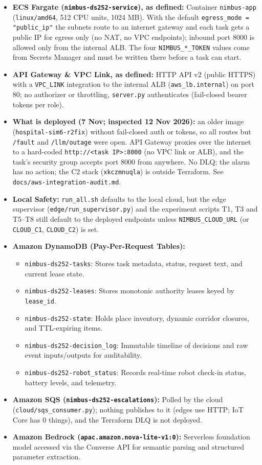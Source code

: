 \documentclass[10pt,letterpaper]{article}
\begin{document}
\begin{itemize}
  \item \textbf{ECS Fargate (\texttt{nimbus-ds252-service}), as defined:} Container \texttt{nimbus-app} (\texttt{linux/amd64}, 512 CPU units, 1024 MB). With the default \texttt{egress\_mode = "public\_ip"} the subnets route to an internet gateway and each task gets a public IP for egress only (no NAT, no VPC endpoints); inbound port 8000 is allowed only from the internal ALB. The four \texttt{NIMBUS\_*\_TOKEN} values come from Secrets Manager and must be written there before a task can start.
  \item \textbf{API Gateway \& VPC Link, as defined:} HTTP API v2 (public HTTPS) with a \texttt{VPC\_LINK} integration to the internal ALB (\texttt{aws\_lb.internal}) on port 80; no authorizer or throttling, \texttt{server.py} authenticates (fail-closed bearer tokens per role).
  \item \textbf{What is deployed (7 Nov; inspected 12 Nov 2026):} an older image (\texttt{hospital-sim6-r2fix}) without fail-closed auth or tokens, so all routes but \texttt{/fault} and \texttt{/llm/outage} were open. API Gateway proxies over the internet to a hard-coded \texttt{http://<task IP>:8000} (no VPC link or ALB), and the task's security group accepts port 8000 from anywhere. No DLQ; the alarm has no action; the C2 stack (\texttt{xkczmnuqla}) is outside Terraform. See \texttt{docs/aws-integration-audit.md}.
  \item \textbf{Local Safety:} \texttt{run\_all.sh} defaults to the local cloud, but the edge supervisor (\texttt{edge/run\_supervisor.py}) and the experiment scripts T1, T3 and T5--T8 still default to the deployed endpoints unless \texttt{NIMBUS\_CLOUD\_URL} (or \texttt{CLOUD\_C1}, \texttt{CLOUD\_C2}) is set.
  \item \textbf{Amazon DynamoDB (Pay-Per-Request Tables):}
  \begin{itemize}
    \item \texttt{nimbus-ds252-tasks}: Stores task metadata, status, request text, and current lease state.
    \item \texttt{nimbus-ds252-leases}: Stores monotonic authority leases keyed by \texttt{lease\_id}.
    \item \texttt{nimbus-ds252-state}: Holds place inventory, dynamic corridor closures, and TTL-expiring items.
    \item \texttt{nimbus-ds252-decision\_log}: Immutable timeline of decisions and raw event inputs/outputs for auditability.
    \item \texttt{nimbus-ds252-robot\_status}: Records real-time robot check-in status, battery levels, and telemetry.
  \end{itemize}
  \item \textbf{Amazon SQS (\texttt{nimbus-ds252-escalations}):} Polled by the cloud (\texttt{cloud/sqs\_consumer.py}); nothing publishes to it (edges use HTTP; IoT Core has 0 things), and the Terraform DLQ is not deployed.
  \item \textbf{Amazon Bedrock (\texttt{apac.amazon.nova-lite-v1:0}):} Serverless foundation model accessed via the Converse API for semantic parsing and structured parameter extraction.
\end{itemize}
\end{document}
